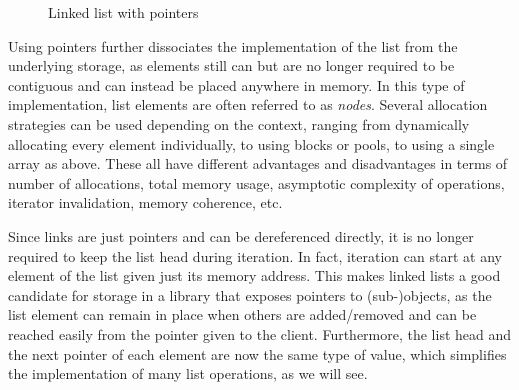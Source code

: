 \begin{figure}[ht]
    \centering
    \caption{Linked list with pointers}
    \label{fig:struct:list}
\end{figure}

Using pointers further dissociates the implementation of the list from the
underlying storage, as elements still can but are no longer required to be
contiguous and can instead be placed anywhere in memory.  In this type of
implementation, list elements are often referred to as \textit{nodes}.  Several
allocation strategies can be used depending on the context, ranging from
dynamically allocating every element individually, to using blocks or pools, to
using a single array as above.  These all have different advantages and
disadvantages in terms of number of allocations, total memory usage, asymptotic
complexity of operations, iterator invalidation, memory coherence, etc.

Since links are just pointers and can be dereferenced directly, it is no longer
required to keep the list head during iteration.  In fact, iteration can start
at any element of the list given just its memory address.  This makes linked
lists a good candidate for storage in a library that exposes pointers to
(sub-)objects, as the list element can remain in place when others are
added/removed and can be reached easily from the pointer given to the client.
Furthermore, the list head and the next pointer of each element are now the same
type of value, which simplifies the implementation of many list operations, as
we will see.

